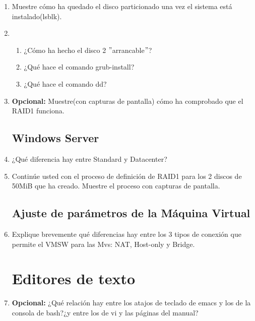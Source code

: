 \documentclass[paper=a4, fontsize=11pt]{scrartcl} %
\numberwithin{equation}{section} %
\numberwithin{figure}{section} %
\numberwithin{table}{section} %
\begin{document}
\begin{enumerate}
		\item Muestre cómo ha quedado el disco particionado una vez el sistema está instalado(lsblk).
		
		\item \begin{enumerate}
			\item ¿Cómo ha hecho el disco 2 $"$arrancable$"$?
			
			\item ¿Qué hace el comando grub-install?
			
			\item ¿Qué hace el comando dd?
		\end{enumerate}
		
		\item \textbf{Opcional:} Muestre(con capturas de pantalla) cómo ha comprobado que el RAID1
		funciona.
		
	\subsection{Windows Server}
		\item ¿Qué diferencia hay entre Standard y Datacenter?
		
		\item Continúe usted con el proceso de definición de RAID1 para los 2 discos de 50MiB que
		ha creado. Muestre el proceso con capturas de pantalla.
		
	\subsection{Ajuste de parámetros de la Máquina Virtual}
		\item Explique brevemente qué diferencias hay entre los 3 tipos de conexión que permite el
		VMSW para las Mvs: NAT, Host-only y Bridge.
		
	\section{Editores de texto}
		\item \textbf{Opcional:} ¿Qué relación hay entre los atajos de teclado de emacs y los de
		la consola de bash?¿y entre los de vi y las páginas del manual?
		
\end{enumerate}


\newpage
\end{document}

